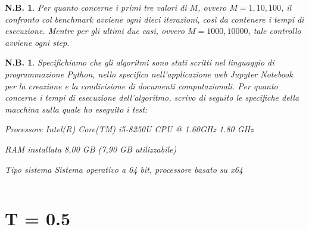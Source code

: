 \documentclass[a4paper,11pt,openright]{report}
\newtheorem{notabene}[teo]{N.B.}
\begin{document}
\begin{notabene}
Per quanto concerne i primi tre valori di $M$, ovvero $M = 1, 10, 100$, il confronto col benchmark avviene ogni dieci iterazioni, così da contenere i tempi di esecuzione. Mentre per gli ultimi due casi, ovvero $M = 1000, 10000$, tale controllo avviene ogni step.
\end{notabene}

\begin{notabene}
Specifichiamo che gli algoritmi sono stati scritti nel linguaggio di programmazione Python, nello specifico nell'applicazione web Jupyter Notebook per la creazione e la condivisione di documenti computazionali. Per quanto concerne i tempi di esecuzione dell'algoritmo, scrivo di seguito le specifiche della macchina sulla quale ho eseguito i test:

Processore	Intel(R) Core(TM) i5-8250U CPU @ 1.60GHz   1.80 GHz 

RAM installata	8,00 GB (7,90 GB utilizzabile) 


Tipo sistema	Sistema operativo a 64 bit, processore basato su x64 
\end{notabene}
\[
\]
\newpage
\section{T = 0.5}
\end{document}
